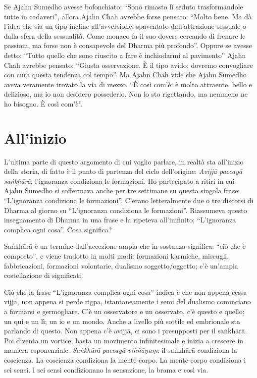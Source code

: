Se Ajahn Sumedho avesse bofonchiato: ``Sono rimasto lì seduto trasformandole tutte in cadaveri'', allora Ajahn Chah avrebbe forse pensato: ``Molto bene. Ma dà l'idea che sia un tipo incline all'avversione, spaventato dall'attrazione sessuale o dalla sfera della sessualità. Come monaco fa il suo dovere cercando di frenare le passioni, ma forse non è consapevole del Dharma più profondo''. Oppure se avesse detto: ``Tutto quello che sono riuscito a fare è inchiodarmi al pavimento'' Ajahn Chah avrebbe pensato: ``Giusta osservazione. È il tipo avido; dovremo convogliare con cura questa tendenza col tempo''. Ma Ajahn Chah vide che Ajahn Sumedho aveva veramente trovato la via di mezzo. ``È così com'è: è molto attraente, bello e delizioso, ma io non desidero possederlo. Non lo sto rigettando, ma nemmeno ne ho bisogno. È così com'è''.

\section*{All'inizio}

L'ultima parte di questo argomento di cui voglio parlare, in realtà sta all'inizio della storia, di fatto è il punto di partenza del ciclo dell'origine: \textit{Avijjā paccayā saṅkhārā}, l'ignoranza condiziona le formazioni. Ho partecipato a ritiri in cui Ajahn Sumedho si soffermava anche per tre settimane su questa singola frase: ``L'ignoranza condiziona le formazioni''. C'erano letteralmente due o tre discorsi di Dharma al giorno su ``L'ignoranza condiziona le formazioni''. Riassumeva questo insegnamento di Dharma in una frase e la ripeteva all'inifinito; ``L'ignoranza complica ogni cosa''. Cosa significa?

Saṅkhārā è un termine dall'accezione ampia che in sostanza significa: ``ciò che è composto'', e viene tradotto in molti modi: formazioni karmiche, miscugli, fabbricazioni, formazioni volontarie, dualismo soggetto/oggetto; c'è un'ampia costellazione di significati.

Ciò che la frase ``L'ignoranza complica ogni cosa'' indica è che non appena cessa vijjā, non appena si perde rigpa, istantaneamente i semi del dualismo cominciano a formarsi e germogliare. C'è un osservatore e un osservato, c'è questo e quello; un qui e un lì; un io e un mondo. Anche a livello più sottile ed embrionale sta parlando di questo. Non appena c'è avijjā, ci sono i presupposti per il saṅkhārā. Poi diventa un vortice; basta un movimento infinitesimale e inizia a crescere in maniera esponenziale. \textit{Saṅkhārā} \textit{paccayā viññāṇaṃ}: il saṅkhārā condiziona la coscienza. La coscienza condiziona la mente-corpo. La mente-corpo condiziona i sei sensi. I sei sensi condizionano la sensazione, la brama e così via.

